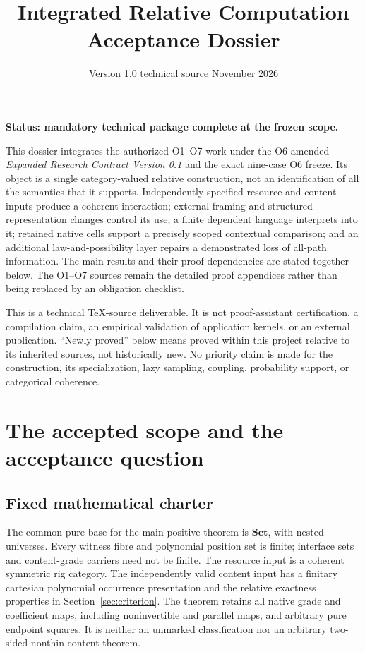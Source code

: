 \documentclass[11pt,a4paper]{article}
\title{Integrated Relative Computation Acceptance Dossier}
\author{}
\date{Version 1.0 technical source\quad 2 November 2026}
\theoremstyle{definition}
\newcommand{\Set}{\mathbf{Set}}
\newcommand{\Status}{\textbf{Status: mandatory technical package complete at the frozen scope.}}
\begin{document}
\maketitle
\vspace{-1em}

\Status

This dossier integrates the authorized O1--O7 work under the O6-amended
\emph{Expanded Research Contract Version 0.1} and the exact nine-case O6
freeze. Its object is a single category-valued relative construction,
not an identification of all the semantics that it supports. Independently
specified resource and content inputs produce a coherent interaction;
external framing and structured representation changes control its use;
a finite dependent language interprets into it; retained native cells
support a precisely scoped contextual comparison; and an additional
law-and-possibility layer repairs a demonstrated loss of all-path information.
The main results and their proof dependencies are stated together below.
The O1--O7 sources remain the detailed proof appendices rather than being
replaced by an obligation checklist.

This is a technical TeX-source deliverable. It is not proof-assistant
certification, a compilation claim, an empirical validation of application
kernels, or an external publication. ``Newly proved'' below means proved
within this project relative to its inherited sources, not historically new.
No priority claim is made for the construction, its specialization, lazy
sampling, coupling, probability support, or categorical coherence.

\section{The accepted scope and the acceptance question}\label{sec:scope}

\subsection{Fixed mathematical charter}
The common pure base for the main positive theorem is \(\Set\), with
nested universes. Every witness fibre and polynomial position set is finite;
interface sets and content-grade carriers need not be finite. The resource
input is a coherent symmetric rig category. The independently valid content
input has a finitary cartesian polynomial occurrence presentation and the
relative exactness properties in Section~\ref{sec:criterion}. The theorem
retains all native grade and coefficient maps, including noninvertible and
parallel maps, and arbitrary pure endpoint squares. It is neither an
unmarked classification nor an arbitrary two-sided nonthin-content theorem.
\end{document}

